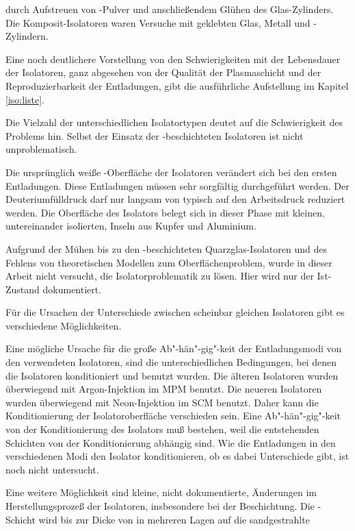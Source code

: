 durch Aufstreuen von \AlO-Pulver und anschließendem Glühen des
Glas-Zylinders. Die Komposit-Isolatoren waren Versuche mit geklebten
Glas, Metall und \AlO-Zylindern.
\par
Eine noch deutlichere Vorstellung von den Schwierigkeiten mit der
Lebensdauer der Isolatoren, ganz abgesehen von der Qualität der
Plasmaschicht und der Reproduzierbarkeit der Entladungen, gibt die
ausführliche Aufstellung im Kapitel \vref{iso:liste}.
\par
Die Vielzahl der unterschiedlichen Isolatortypen deutet auf die
Schwierigkeit des Problems hin. Selbst der Einsatz der
\AlO-beschichteten Isolatoren ist nicht unproblematisch.
\par
Die ursprünglich weiße \AlO-Oberfläche der Isolatoren verändert
sich bei den ersten Entladungen. Diese Entladungen müssen sehr
sorgfältig durchgeführt werden. Der Deuteriumfülldruck darf nur
langsam von typisch  auf den Arbeitsdruck reduziert
werden. Die Oberfläche des Isolators belegt sich in dieser Phase
mit kleinen, untereinander isolierten, Inseln aus Kupfer und
Aluminium.
\par
Aufgrund der Mühen bis zu den \AlO-beschichteten
Quarzglas-Isolatoren und des Fehlens von theoretischen Modellen
zum Oberflächenproblem, wurde in dieser Arbeit nicht versucht, die
Isolatorproblematik zu lösen. Hier wird nur der Ist-Zustand
dokumentiert.
\par
Für die Ursachen der Unterschiede zwischen scheinbar gleichen Isolatoren gibt
es verschiedene Möglichkeiten.
\par
Eine mögliche Ursache für die große Ab"-hän"-gig"-keit der
Entladungsmodi von den verwendeten Isolatoren, sind die
unterschiedlichen Bedingungen, bei denen die Isolatoren
konditioniert und benutzt wurden. Die älteren Isolatoren wurden
überwiegend mit Argon-Injektion im MPM benutzt. Die neueren
Isolatoren wurden überwiegend mit Neon-Injektion im SCM benutzt.
Daher kann die Konditionierung der Isolatoroberfläche verschieden
sein. Eine Ab"-hän"-gig"-keit von der Konditionierung des
Isolators muß bestehen, weil die entstehenden Schichten von der
Konditionierung abhängig sind. Wie die Entladungen in den
verschiedenen Modi den Isolator konditionieren, ob es dabei
Unterschiede gibt, ist noch nicht untersucht.
\par
Eine weitere Möglichkeit sind kleine, nicht dokumentierte,
Änderungen im Herstellungsprozeß der Isolatoren, insbesondere bei
der Beschichtung. Die \AlO-Schicht wird bis zur Dicke von
 in mehreren Lagen auf die sandgestrahlte
